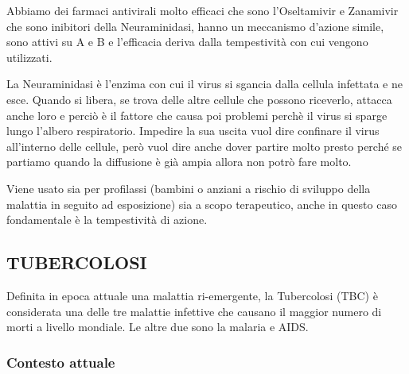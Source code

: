 Abbiamo dei farmaci antivirali molto efficaci che sono l'Oseltamivir e
Zanamivir che sono inibitori della Neuraminidasi, hanno un meccanismo
d'azione simile, sono attivi su A e B e l'efficacia deriva dalla
tempestività con cui vengono utilizzati.

La Neuraminidasi è l'enzima con cui il virus si sgancia dalla cellula
infettata e ne esce. Quando si libera, se trova delle altre cellule che
possono riceverlo, attacca anche loro e perciò è il fattore che causa
poi problemi perchè il virus si sparge lungo l'albero respiratorio.
Impedire la sua uscita vuol dire confinare il virus all'interno delle
cellule, però vuol dire anche dover partire molto presto perché se
partiamo quando la diffusione è già ampia allora non potrò fare molto.

Viene usato sia per profilassi (bambini o anziani a rischio di sviluppo
della malattia in seguito ad esposizione) sia a scopo terapeutico, anche
in questo caso fondamentale è la tempestività di azione.

\subsection{TUBERCOLOSI}


Definita in epoca attuale una malattia ri-emergente, la Tubercolosi
(TBC) è considerata una delle tre malattie infettive che causano il
maggior numero di morti a livello mondiale. Le altre due sono la malaria
e AIDS.

\subsubsection{Contesto attuale}



